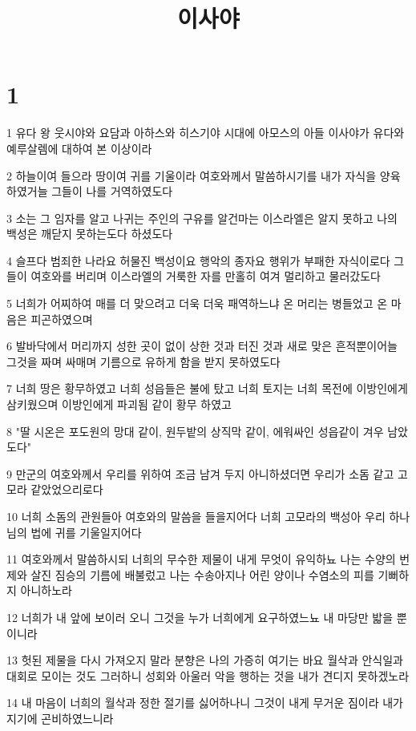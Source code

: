 

\title{이사야}


\chapter{1}

\par 1 유다 왕 웃시야와 요담과 아하스와 히스기야 시대에 아모스의 아들 이사야가 유다와 예루살렘에 대하여 본 이상이라
\par 2 하늘이여 들으라 땅이여 귀를 기울이라 여호와께서 말씀하시기를 내가 자식을 양육하였거늘 그들이 나를 거역하였도다
\par 3 소는 그 임자를 알고 나귀는 주인의 구유를 알건마는 이스라엘은 알지 못하고 나의 백성은 깨닫지 못하는도다 하셨도다
\par 4 슬프다 범죄한 나라요 허물진 백성이요 행악의 종자요 행위가 부패한 자식이로다 그들이 여호와를 버리며 이스라엘의 거룩한 자를 만홀히 여겨 멀리하고 물러갔도다
\par 5 너희가 어찌하여 매를 더 맞으려고 더욱 더욱 패역하느냐 온 머리는 병들었고 온 마음은 피곤하였으며
\par 6 발바닥에서 머리까지 성한 곳이 없이 상한 것과 터진 것과 새로 맞은 흔적뿐이어늘 그것을 짜며 싸매며 기름으로 유하게 함을 받지 못하였도다
\par 7 너희 땅은 황무하였고 너희 성읍들은 불에 탔고 너희 토지는 너희 목전에 이방인에게 삼키웠으며 이방인에게 파괴됨 같이 황무 하였고
\par 8 "딸 시온은 포도원의 망대 같이, 원두밭의 상직막 같이, 에워싸인 성읍같이 겨우 남았도다"
\par 9 만군의 여호와께서 우리를 위하여 조금 남겨 두지 아니하셨더면 우리가 소돔 같고 고모라 같았었으리로다
\par 10 너희 소돔의 관원들아 여호와의 말씀을 들을지어다 너희 고모라의 백성아 우리 하나님의 법에 귀를 기울일지어다
\par 11 여호와께서 말씀하시되 너희의 무수한 제물이 내게 무엇이 유익하뇨 나는 수양의 번제와 살진 짐승의 기름에 배불렀고 나는 수송아지나 어린 양이나 수염소의 피를 기뻐하지 아니하노라
\par 12 너희가 내 앞에 보이러 오니 그것을 누가 너희에게 요구하였느뇨 내 마당만 밟을 뿐이니라
\par 13 헛된 제물을 다시 가져오지 말라 분향은 나의 가증히 여기는 바요 월삭과 안식일과 대회로 모이는 것도 그러하니 성회와 아울러 악을 행하는 것을 내가 견디지 못하겠노라
\par 14 내 마음이 너희의 월삭과 정한 절기를 싫어하나니 그것이 내게 무거운 짐이라 내가 지기에 곤비하였느니라
